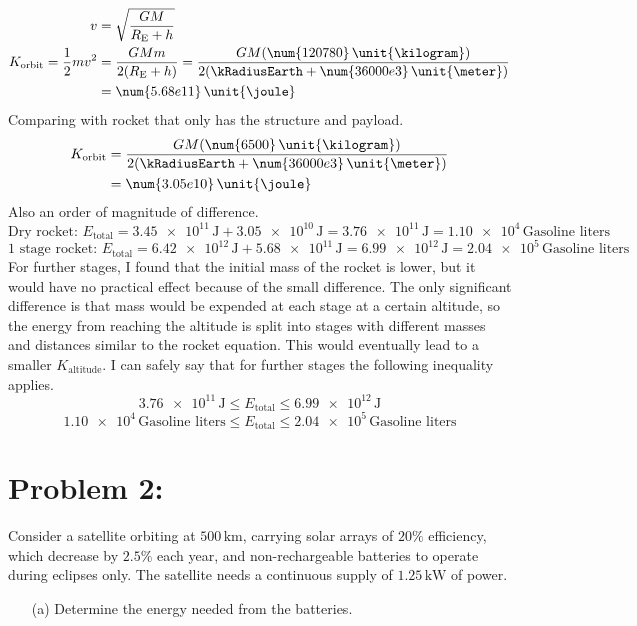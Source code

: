 \documentclass{article}
\begin{document}
{\begin{enumerate}
		\begin{equation*}
			\begin{split}
				v &= \sqrt{\frac{GM}{R_\mathrm{E} + h}} \\
				K_\mathrm{orbit} = \frac{1}{2}m v^2 &= \frac{GMm}{2(R_\mathrm{E} + h)} = \frac{GM(\num{120780} \, \unit{\kilogram})}{2(\kRadiusEarth + \num{36000e3} \, \unit{\meter})} \\
				&= \num{5.68e11} \, \unit{\joule}
			\end{split}
		\end{equation*}
		Comparing with rocket that only has the structure and payload.
		\begin{equation*}
			\begin{split}
				K_\mathrm{orbit} &= \frac{GM(\num{6500} \, \unit{\kilogram})}{2(\kRadiusEarth + \num{36000e3} \, \unit{\meter})} \\
				&= \num{3.05e10} \, \unit{\joule}
			\end{split}
		\end{equation*}
		Also an order of magnitude of difference.
		\[
			\text{Dry rocket: } E_\mathrm{total} = \num{3.45e11} \, \unit{\joule} + \num{3.05e10} \, \unit{\joule} = \num{3.76e11} \, \unit{\joule} = \num{1.10e4} \, \unit{\text{Gasoline liters}}
		\]
		\[
			\text{1 stage rocket: } E_\mathrm{total} = \num{6.42e12} \, \unit{\joule} + \num{5.68e11} \, \unit{\joule} = \num{6.99e12} \, \unit{\joule} = \num{2.04e5} \, \unit{\text{Gasoline liters}}
		\]
		For further stages, I found that the initial mass of the rocket is lower, but it would have no practical effect because of the small difference. The only significant difference is that mass would be expended at each stage at a certain altitude, so the energy from reaching the altitude is split into stages with different masses and distances similar to the rocket equation. This would eventually lead to a smaller $K_\mathrm{altitude}$. I can safely say that for further stages the following inequality applies.
		\[
			\num{3.76e11} \, \unit{\joule} \leq E_\mathrm{total} \leq \num{6.99e12} \, \unit{\joule}
		\]
		\[
			\num{1.10e4} \, \unit{\text{Gasoline liters}} \leq E_\mathrm{total} \leq \num{2.04e5} \, \unit{\text{Gasoline liters}}
		\]
 			
 
 		
 		
 			
		
	\end{enumerate}
	
	\clearpage
	
	\section*{Problem 2: }
	Consider a satellite orbiting at $\num{500} \, \unit{\kilo\meter}$, carrying solar arrays of $20 \%$ efficiency, which decrease by $2.5 \%$ each year, and non-rechargeable batteries to operate during eclipses only. The satellite needs a continuous supply of $\num{1.25} \, \unit{\kilo\watt}$ of power. \\
	\begin{enumerate}
		\item[(a)] Determine the energy needed from the batteries. \\

\end{enumerate}}
\end{document}
